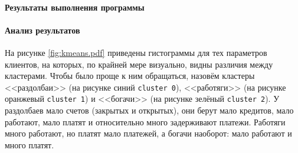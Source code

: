 \documentclass[12pt,a4paper]{article}
\begin{document}
\begin{Shaded}
\begin{Highlighting}[]
\OperatorTok{=}
   
\NormalTok{    plt.title(cols[cols[}\NormalTok{] }\OperatorTok{==}\NormalTok{ col][}\NormalTok{].iloc[}\NormalTok{])}
     
\NormalTok{      data[kmeans.labels\_ }\OperatorTok{==}\NormalTok{ i][col].hist(label}\OperatorTok{=}\SpecialCharTok{\{}\SpecialCharTok{\}}\SpecialStringTok{\textquotesingle{}}\OperatorTok{=}\NormalTok{)}

\OperatorTok{=}\NormalTok{, }\OperatorTok{=}\NormalTok{(}\NormalTok{, }\NormalTok{))}
\NormalTok{cluster\_hist([}
  \NormalTok{, }\NormalTok{, }\NormalTok{,}
  \NormalTok{, }\NormalTok{, }
\NormalTok{], axs)}

\NormalTok{)}
\end{Highlighting}
\end{Shaded}

  \paragraph*{Результаты выполнения программы}

  \paragraph*{Анализ результатов}
  На рисунке \ref{fig:kmeans.pdf} приведены гистограммы для тех параметров клиентов, на которых, по крайней мере визуально, видны различия между кластерами.
  Чтобы было проще к ним обращаться, назовём кластеры
  <<раздолбаи>> (на рисунке синий \texttt{cluster 0}),
  <<работяги>> (на рисунке оранжевый \texttt{cluster 1}) и
  <<богачи>> (на рисунке зелёный \texttt{cluster 2}).
  У раздолбаев мало счетов (закрытых и открытых), они берут мало кредитов, мало работают, мало платят и относительно много задерживают платежи.
  Работяги много работают, но платят мало платежей, а богачи наоборот: мало работают и много платят.
\end{document}
